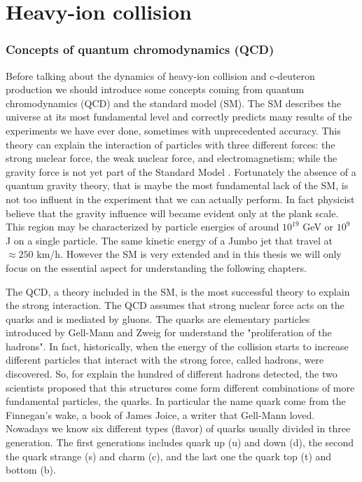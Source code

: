 \documentclass[12pt,a4paper]{book}
\begin{document}
	\chapter{Heavy-ion collision}
	\subsection{Concepts of quantum chromodynamics (QCD)}
	Before talking about the dynamics of heavy-ion collision and c-deuteron production we should introduce some concepts coming from quantum chromodynamics (QCD) and the standard model (SM). The SM describes the universe at its most fundamental level and correctly predicts many results of the experiments we have ever done, sometimes with unprecedented accuracy. This theory can explain the interaction of particles with three different forces: the strong nuclear force, the weak nuclear force, and electromagnetism; while the gravity force is not yet part of the Standard Model \cite{quevedo2024cambridgelecturesstandardmodel}. Fortunately the absence of a quantum gravity theory, that is maybe the most fundamental lack of the SM, is not too influent in the experiment that we can actually perform. In fact physicist believe that the gravity influence will became evident only at the plank scale. This region may be characterized by particle energies of around $10^{19}$ GeV or $10^9$ J on a single particle. The same kinetic energy of a Jumbo jet that travel at $\approx 250$ km/h. However the SM is very extended and in this thesis we will only focus on the essential aspect for understanding the following chapters.
	
	
	The QCD, a theory included in the SM, is the most successful theory to explain the strong interaction. The QCD assumes that strong nuclear force acts on the quarks and is mediated by gluons. The quarks are elementary particles introduced by Gell-Mann and Zweig for understand the "proliferation of the hadrons". In fact, historically, when the energy of the collision starts to increase different particles that interact with the strong force, called hadrons, were discovered. So, for explain the hundred of different hadrons detected, the two scientists proposed that this structures come form different combinations of more fundamental particles, the quarks. In particular the name quark come from the Finnegan's wake, a book of James Joice, a writer that Gell-Mann loved. Nowadays we know six different types (flavor) of quarks usually divided in three generation. The first generations includes quark up (u) and down (d), the second the quark strange (s) and charm (c), and the last one the quark top (t) and bottom (b). 
	
\end{document}
